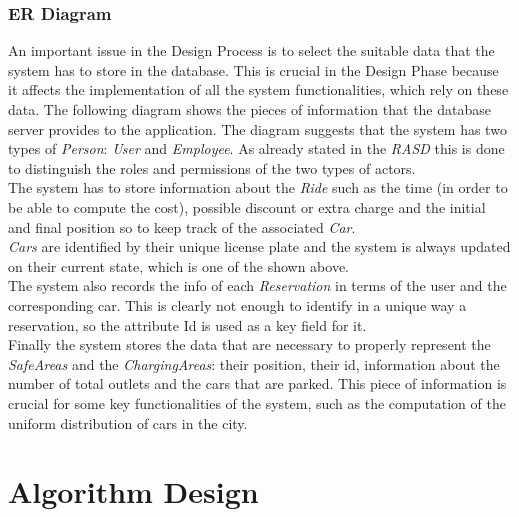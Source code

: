 \documentclass[11pt,a4paper]{report}
\begin{document}
\subsection{ER Diagram}
An important issue in the Design Process is to select the suitable data that the system has to store in the database. This is crucial in the Design Phase because it affects the implementation of all the system functionalities, which rely on these data. The following diagram shows the pieces of information that the database server provides to the application.
\noindent The diagram suggests that the system has two types of \textit{Person}: \textit{User} and \textit{Employee}. As already stated in the \textit{RASD} this is done to distinguish the roles and permissions of the two types of actors.\\
The system has to store information about the \textit{Ride} such as the time (in order to be able to compute the cost), possible discount or extra charge and the initial and final position so to keep track of the associated \textit{Car}.\\\textit{Cars} are identified by their unique license plate and the system is always updated on their current state, which is one of the shown above.\\The system also records the info of each \textit{Reservation} in terms of the user and the corresponding car. This is clearly not enough to identify in a unique way a reservation, so the attribute Id is used as a key field for it.\\
Finally the system stores the data that are necessary to properly represent the \textit{SafeAreas} and the \textit{ChargingAreas}: their position, their id, information about the number of total outlets and the cars that are parked. This piece of information is crucial for some key functionalities of the system, such as the computation of the uniform distribution of cars in the city.

\chapter{Algorithm Design}
\end{document}
